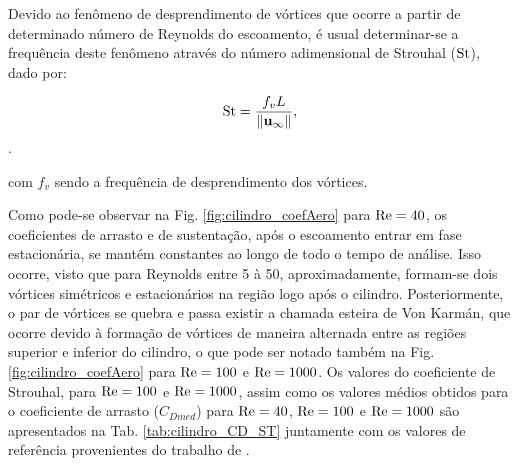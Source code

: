 \documentclass[tese_patricia]{subfiles}%
\begin{document}
Devido ao fenômeno de desprendimento de vórtices que ocorre a partir de determinado número de Reynolds do escoamento, é usual determinar-se a frequência deste fenômeno através do número adimensional de Strouhal ($\mathrm{St}$), dado por:

\begin{align}
	\mathrm{St} = \frac{f_{v}L}{\lVert \mathbf{u}_{\infty} \lVert},
\end{align}.

\noindent com $f_{v}$ sendo a frequência de desprendimento dos vórtices.

Como pode-se observar na Fig. \ref{fig:cilindro_coefAero} para $\mathrm{Re} = 40$, os coeficientes de arrasto e de sustentação, após o escoamento entrar em fase estacionária, se mantém constantes ao longo de todo o tempo de análise. Isso ocorre, visto que para Reynolds entre 5 à 50, aproximadamente, formam-se dois vórtices simétricos e estacionários na região logo após o cilindro. Posteriormente, o par de vórtices se quebra e passa existir a chamada esteira de Von Karmán, que ocorre devido à formação de vórtices de maneira alternada entre as regiões superior e inferior do cilindro, o que pode ser notado também na Fig. \ref{fig:cilindro_coefAero}  para $\mathrm{Re} = 100$ e $\mathrm{Re}=1000$. Os valores do coeficiente de Strouhal, para $\mathrm{Re} = 100$ e $\mathrm{Re}=1000$, assim como os valores médios obtidos para o coeficiente de arrasto ($C_{Dmed}$) para $\mathrm{Re} = 40$, $\mathrm{Re} = 100$ e $\mathrm{Re} = 1000$ são apresentados na Tab. \ref{tab:cilindro_CD_ST} juntamente com os valores de referência provenientes do trabalho de .
\end{document}
